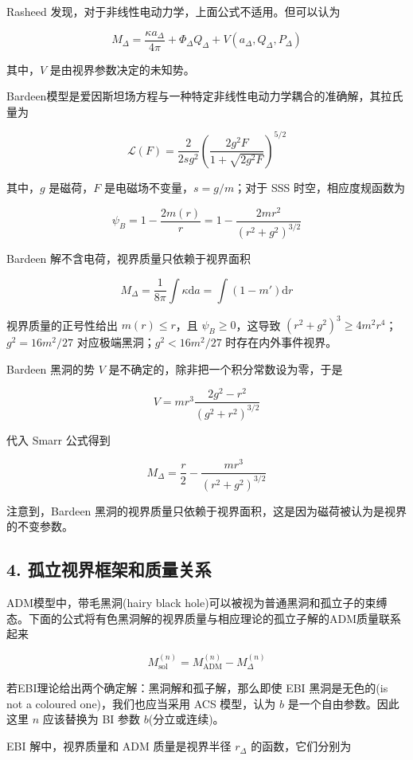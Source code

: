 \documentclass[aps,prl,preprint,groupedaddress]{revtex4-2}
\begin{document}
Rasheed 发现，对于非线性电动力学，上面公式不适用。但可以认为

$$
M_\Delta = \frac{\kappa a_\Delta }{4\pi } + \Phi_\Delta Q_\Delta + V\left(a_\Delta , Q_\Delta , P_\Delta \right)
$$

其中，$V$ 是由视界参数决定的未知势。

Bardeen模型是爱因斯坦场方程与一种特定非线性电动力学耦合的准确解，其拉氏量为

$$
\mathcal{L}(F)
=\frac{2 }{2 sg^2 } \left(\frac{2g^2 F }{1+\sqrt{2g^2 F} }  \right)^{5/2}
$$

其中，$g$ 是磁荷，$F$ 是电磁场不变量，$s=g/m$；对于 SSS 时空，相应度规函数为

$$
\psi_B
=1-\frac{2 m(r) }{r } 
=1-\frac{2mr^2 }{\left(r^2+g^2 \right)^{3/2} }
$$

Bardeen 解不含电荷，视界质量只依赖于视界面积

$$
M_\Delta
=\frac{1 }{8\pi } \int\kappa \mathrm{d}a
=\int \left(1-m' \right)\mathrm{d}r
$$

视界质量的正号性给出 $m(r)\leq r$，且 $\psi_B\geq 0$，这导致 $(r^2+g^2)^3\geq 4m^2 r^4$；$g^2=16m^2/27$ 对应极端黑洞；$g^2<16m^2/27$ 时存在内外事件视界。

Bardeen 黑洞的势 $V$ 是不确定的，除非把一个积分常数设为零，于是
    
$$
V = m r^3 \frac{2g^2 - r^2 }{\left(g^2 + r^2 \right)^{3/2} }
$$

代入 Smarr 公式得到

$$
M_\Delta = \frac{r }{2 } - \frac{m r^3 }{\left(r^2+g^2 \right)^{3/2} } 
$$

注意到，Bardeen 黑洞的视界质量只依赖于视界面积，这是因为磁荷被认为是视界的不变参数。

\subsection{4. 孤立视界框架和质量关系}

ADM模型中，带毛黑洞(hairy black hole)可以被视为普通黑洞和孤立子的束缚态。下面的公式将有色黑洞解的视界质量与相应理论的孤立子解的ADM质量联系起来

$$
M_{\mathrm{sol}}^{(n)} = M_{\mathrm{ADM}}^{(n)} - M_\Delta^{(n)} 
$$

若EBI理论给出两个确定解：黑洞解和孤子解，那么即使 EBI 黑洞是无色的(is not a coloured one)，我们也应当采用 ACS 模型，认为 $b$ 是一个自由参数。因此这里 $n$ 应该替换为 BI 参数 $b$(分立或连续)。 

EBI 解中，视界质量和 ADM 质量是视界半径 $r_\Delta$ 的函数，它们分别为
\end{document}
